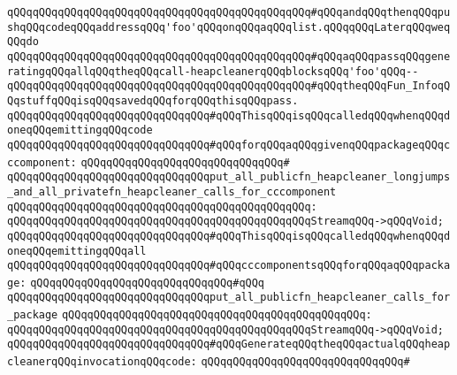 \verb|qQQqqQQqqQQqqQQqqQQqqQQqqQQqqQQqqQQqqQQqqQQqqQQq#qQQqandqQQqthenqQQqpushqQQqcodeqQQqaddressqQQq'foo'qQQqonqQQqaqQQqlist.qQQqqQQqLaterqQQqweqQQqdo|\newline
\verb|qQQqqQQqqQQqqQQqqQQqqQQqqQQqqQQqqQQqqQQqqQQqqQQq#qQQqaqQQqpassqQQqgeneratingqQQqallqQQqtheqQQqcall-heapcleanerqQQqblocksqQQq'foo'qQQq--|\newline
\verb|qQQqqQQqqQQqqQQqqQQqqQQqqQQqqQQqqQQqqQQqqQQqqQQq#qQQqtheqQQqFun_InfoqQQqstuffqQQqisqQQqsavedqQQqforqQQqthisqQQqpass.|\newline
\newline
\newline
\verb|qQQqqQQqqQQqqQQqqQQqqQQqqQQqqQQq#qQQqThisqQQqisqQQqcalledqQQqwhenqQQqdoneqQQqemittingqQQqcode|\newline
\verb|qQQqqQQqqQQqqQQqqQQqqQQqqQQqqQQq#qQQqforqQQqaqQQqgivenqQQqpackageqQQqcccomponent:|\newline
\verb|qQQqqQQqqQQqqQQqqQQqqQQqqQQqqQQq#|\newline
\verb|qQQqqQQqqQQqqQQqqQQqqQQqqQQqqQQqput_all_publicfn_heapcleaner_longjumps_and_all_privatefn_heapcleaner_calls_for_cccomponent|\newline
\verb|qQQqqQQqqQQqqQQqqQQqqQQqqQQqqQQqqQQqqQQqqQQqqQQq:|\newline
\verb|qQQqqQQqqQQqqQQqqQQqqQQqqQQqqQQqqQQqqQQqqQQqqQQqStreamqQQq->qQQqVoid;|\newline
\newline
\newline
\verb|qQQqqQQqqQQqqQQqqQQqqQQqqQQqqQQq#qQQqThisqQQqisqQQqcalledqQQqwhenqQQqdoneqQQqemittingqQQqall|\newline
\verb|qQQqqQQqqQQqqQQqqQQqqQQqqQQqqQQq#qQQqcccomponentsqQQqforqQQqaqQQqpackage:|\newline
\verb|qQQqqQQqqQQqqQQqqQQqqQQqqQQqqQQq#qQQq|\newline
\verb|qQQqqQQqqQQqqQQqqQQqqQQqqQQqqQQqput_all_publicfn_heapcleaner_calls_for_package|\newline
\verb|qQQqqQQqqQQqqQQqqQQqqQQqqQQqqQQqqQQqqQQqqQQqqQQq:|\newline
\verb|qQQqqQQqqQQqqQQqqQQqqQQqqQQqqQQqqQQqqQQqqQQqqQQqStreamqQQq->qQQqVoid;|\newline
\newline
\newline
\verb|qQQqqQQqqQQqqQQqqQQqqQQqqQQqqQQq#qQQqGenerateqQQqtheqQQqactualqQQqheapcleanerqQQqinvocationqQQqcode:|\newline
\verb|qQQqqQQqqQQqqQQqqQQqqQQqqQQqqQQq#|\newline

